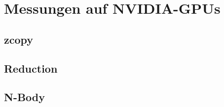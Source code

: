 \section{Messungen auf NVIDIA-GPUs}
\label{nvidia}

\subsection{zcopy}

\subsection{Reduction}

\subsection{N-Body}
